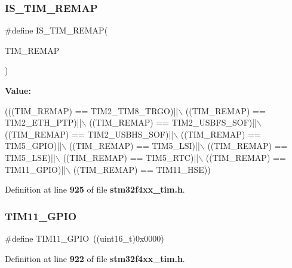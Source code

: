 \subsubsection{I\+S\+\_\+\+T\+I\+M\+\_\+\+R\+E\+M\+AP}
{\footnotesize\ttfamily \#define I\+S\+\_\+\+T\+I\+M\+\_\+\+R\+E\+M\+AP(\begin{DoxyParamCaption}\item[{}]{T\+I\+M\+\_\+\+R\+E\+M\+AP }\end{DoxyParamCaption})}

{\bfseries Value\+:}
\begin{DoxyCode}
(((TIM\_REMAP) == TIM2_TIM8_TRGO)||\(\backslash\)
                                  ((TIM\_REMAP) == TIM2_ETH_PTP)||\(\backslash\)
                                  ((TIM\_REMAP) == TIM2_USBFS_SOF)||\(\backslash\)
                                  ((TIM\_REMAP) == TIM2_USBHS_SOF)||\(\backslash\)
                                  ((TIM\_REMAP) == TIM5_GPIO)||\(\backslash\)
                                  ((TIM\_REMAP) == TIM5_LSI)||\(\backslash\)
                                  ((TIM\_REMAP) == TIM5_LSE)||\(\backslash\)
                                  ((TIM\_REMAP) == TIM5_RTC)||\(\backslash\)
                                  ((TIM\_REMAP) == TIM11_GPIO)||\(\backslash\)
                                  ((TIM\_REMAP) == TIM11_HSE))
\end{DoxyCode}


Definition at line \textbf{ 925} of file \textbf{ stm32f4xx\+\_\+tim.\+h}.

\mbox{\label{group__TIM__Remap_ga96850a4ae7ae9590f1ab9c04ec32bb06}} 
\subsubsection{T\+I\+M11\+\_\+\+G\+P\+IO}
{\footnotesize\ttfamily \#define T\+I\+M11\+\_\+\+G\+P\+IO~((uint16\+\_\+t)0x0000)}



Definition at line \textbf{ 922} of file \textbf{ stm32f4xx\+\_\+tim.\+h}.

\mbox{\label{group__TIM__Remap_ga1d6d3f53290050b59b202e6d72af673a}} 
